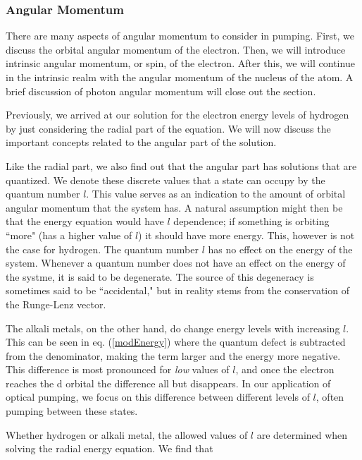 \documentclass[12pt]{article}
\begin{document}
		\subsubsection{Angular Momentum}\label{angularMomentum}
		There are many aspects of angular momentum to consider
		in pumping. First, we discuss the orbital angular momentum of 
		the electron. Then, we will introduce intrinsic angular momentum,
		or spin, of the electron. After this, we will continue in the 
		intrinsic realm with the angular momentum of the nucleus of 
		the atom. A brief discussion of photon angular momentum will
		close out the section.

        Previously, we arrived at our solution for the electron energy 
		levels
        of hydrogen by just considering the radial part of the
        equation. We will now discuss the important concepts related
        to the angular part of the solution. 
        
        Like the radial part, 
        we also find out that the angular part has solutions that 
        are quantized. We denote these discrete values that a state
		can occupy by the quantum number $l$. This value serves as an
		indication to the amount of orbital angular momentum that the 
		system has. A natural assumption might then be that
		the energy equation would have $l$ dependence; if 
		something is orbiting ``more" (has a higher value 
		of $l$) it should have more energy. This, however is not
		the case for hydrogen. The quantum number $l$ has no effect on the 
		energy of the system. Whenever a quantum number does not
		have an effect on the energy of the systme, it is said to
		be degenerate. The source of this degeneracy is sometimes said 
		to be ``accidental," but in reality stems from 
		the conservation of the Runge-Lenz vector.

		The alkali metals, on the other hand, do change energy levels with
		increasing $l$. This can be seen in eq. (\ref{modEnergy}) where 
		the quantum defect
		is subtracted from the denominator, making the term larger and the
		energy more negative.
		This difference is most pronounced for \emph{low} values 
		of $l$, and once the electron reaches the d orbital the difference
		all but disappears. In our application of optical pumping,
		we focus on this difference between different levels of $l$,
		often pumping between these states.
		
		Whether hydrogen or alkali metal, the allowed 
		values of $l$ are determined when solving
		the radial energy equation. We find that
\end{document}
